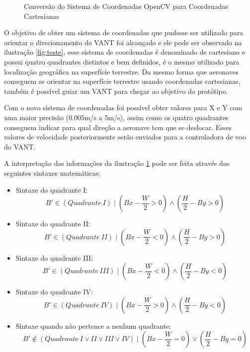 \begin{figure}[H]
	\centering
	\caption{Conversão do Sistema de Coordenadas OpenCV para Coordenadas Cartesianas}
	
	\label{fig:quad2}
\end{figure}

O objetivo de obter um sistema de coordenadas que pudesse ser utilizado para orientar o direcionamento do VANT foi alcançado e ele pode ser observado na ilustração \ref{fig:teste}, esse sistema de coordenadas é denominado de cartesiano e possui quatro quadrantes distintos e bem definidos, é o mesmo utilizado para localização geográfica na superfície terrestre. Da mesmo forma que aeronaves conseguem se orientar na superfície terrestre usando coordenadas cartesianas, também é possível guiar um VANT para chegar ao objetivo do protótipo.

Com o novo sistema de coordenadas foi possivel obter valores para X e Y com uma maior precisão (0.005m/s a 5m/s), assim como os quatro quadrantes conseguem indicar para qual direção a aeronave tem que se deslocar. Esses valores de velocidade posteriormente serão enviados para a controladora de voo do VANT. 

A interpretação das informações da ilustração \ref{fig:quad2} pode ser feita através das seguintes sintaxes matemáticas; 

\begin{itemize}
	\item Sintaxe do quadrante I:\begin{equation}\label{q1} B'\in (Quadrante\ I) \mid \left(Bx - \frac{W}{2} >0\right) \land \left(\frac{H}{2} - By >0\right)\end{equation} 
	\item Sintaxe do quadrante II:\begin{equation}\label{q2} B'\in (Quadrante\ II) \mid \left(Bx - \frac{W}{2} <0\right) \land \left(\frac{H}{2} - By >0\right)\end{equation} 
	\item Sintaxe do quadrante III:\begin{equation}\label{q3} B'\in (Quadrante\ III) \mid \left(Bx - \frac{W}{2} <0\right) \land \left(\frac{H}{2} - By <0\right)\end{equation} 
	\item Sintaxe do quadrante IV:\begin{equation}\label{q4} B'\in (Quadrante\ IV) \mid \left(Bx - \frac{W}{2} >0\right) \land \left(\frac{H}{2} - By <0\right)\end{equation} 
	\item Sintaxe quando não pertence a nenhum quadrante:\begin{equation}\label{nq} B'\notin ( Quadrante\ I\lor II\lor III\lor IV) \mid \left(Bx - \frac{W}{2}=0\right) \lor \left(\frac{H}{2} - By =0\right)\end{equation}
\end{itemize} 

